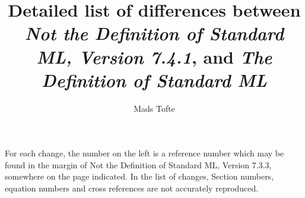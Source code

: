 \title{Detailed list of differences between {\it Not the Definition
of Standard ML, Version 7.4.1}, and {\it The Definition of Standard ML}}
\author{Mads Tofte}

\def\version{7.3.3}

\maketitle
For each change, the number on the left is a reference number
which may be found in the margin
of Not the Definition of Standard ML, Version {\version}, somewhere on the page
indicated. In the list of changes, Section numbers, equation numbers and cross references 
are not accurately reproduced.
\bigskip



